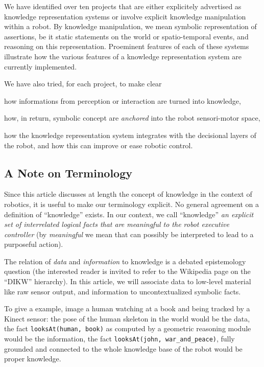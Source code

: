 \documentclass[a4paper, twocolumn]{article}
\newcommand{\concept}[1]{{\footnotesize \texttt{#1}}}
\begin{document}
We have identified over ten projects that are either explicitely advertised as
knowledge representation systems or involve explicit knowledge manipulation
within a robot. By knowledge manipulation, we mean symbolic representation of
assertions, be it static statements on the world or spatio-temporal events, and
reasoning on this representation. Proeminent features of each of these systems
illustrate how the various features of a knowledge representation system are
currently implemented.

We have also tried, for each project, to make clear \begin{inparaenum} \item
how informations from perception or interaction are turned into knowledge,
\item how, in return, symbolic concept are \emph{anchored} into the robot
sensori-motor space, \item how the knowledge representation system integrates
with the decisional layers of the robot, and how this can improve or ease
robotic control.\end{inparaenum}

\subsection*{A Note on Terminology}

Since this article discusses at length the concept of knowledge in the context
of robotics, it is useful to make our terminology explicit.  No general
agreement on a definition of ``knowledge'' exists. In our context, we call
``knowledge'' \emph{an explicit set of interrelated logical facts that are
meaningful to the robot executive controller} (by \emph{meaningful} we mean
that can possibly be interpreted to lead to a purposeful action).

The relation of \emph{data} and \emph{information} to knowledge is a debated
epistemology question (the interested reader is invited to refer to the
Wikipedia page on the ``DIKW'' hierarchy). In this article, we will associate
data to low-level material like raw sensor output, and information to
uncontextualized symbolic facts.

To give a example, image a human watching at a book and being tracked by a
Kinect sensor: the pose of the human skeleton in the world would be the data,
the fact \concept{looksAt(human, book)} as computed by a geometric reasoning
module would be the information, the fact \concept{looksAt(john,
war\_and\_peace)}, fully grounded and connected to the whole knowledge base of
the robot would be proper knowledge.
\end{document}
